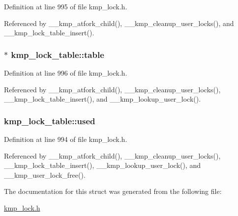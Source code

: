 Definition at line 995 of file kmp\-\_\-lock.\-h.



Referenced by \-\_\-\-\_\-kmp\-\_\-atfork\-\_\-child(), \-\_\-\-\_\-kmp\-\_\-cleanup\-\_\-user\-\_\-locks(), and \-\_\-\-\_\-kmp\-\_\-lock\-\_\-table\-\_\-insert().

\hypertarget{structkmp__lock__table_a89b0c01b5aebf4417258655f6d55ff16}{
\subsubsection[{table}]{$\ast$ kmp\-\_\-lock\-\_\-table\-::table}}\label{structkmp__lock__table_a89b0c01b5aebf4417258655f6d55ff16}


Definition at line 996 of file kmp\-\_\-lock.\-h.



Referenced by \-\_\-\-\_\-kmp\-\_\-atfork\-\_\-child(), \-\_\-\-\_\-kmp\-\_\-cleanup\-\_\-user\-\_\-locks(), \-\_\-\-\_\-kmp\-\_\-lock\-\_\-table\-\_\-insert(), and \-\_\-\-\_\-kmp\-\_\-lookup\-\_\-user\-\_\-lock().

\hypertarget{structkmp__lock__table_a92f49bd4acf0bbe4548629b8010bcc3b}{
\subsubsection[{used}]{ kmp\-\_\-lock\-\_\-table\-::used}}\label{structkmp__lock__table_a92f49bd4acf0bbe4548629b8010bcc3b}


Definition at line 994 of file kmp\-\_\-lock.\-h.



Referenced by \-\_\-\-\_\-kmp\-\_\-atfork\-\_\-child(), \-\_\-\-\_\-kmp\-\_\-cleanup\-\_\-user\-\_\-locks(), \-\_\-\-\_\-kmp\-\_\-lock\-\_\-table\-\_\-insert(), \-\_\-\-\_\-kmp\-\_\-lookup\-\_\-user\-\_\-lock(), and \-\_\-\-\_\-kmp\-\_\-user\-\_\-lock\-\_\-free().



The documentation for this struct was generated from the following file\-:\begin{DoxyCompactItemize}
\item 
\hyperlink{kmp__lock_8h}{kmp\-\_\-lock.\-h}\end{DoxyCompactItemize}

